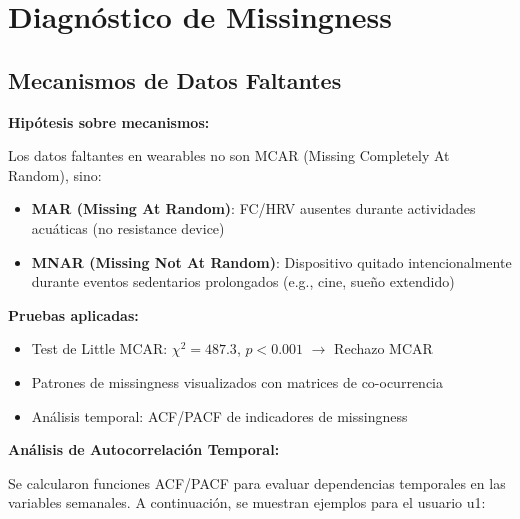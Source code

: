 \documentclass[12pt,letterpaper,twoside]{report}
\begin{document}
\section{Diagnóstico de Missingness}

\subsection{Mecanismos de Datos Faltantes}

\begin{hipotesisbox}
\textbf{Hipótesis sobre mecanismos:}

Los datos faltantes en wearables no son MCAR (Missing Completely At Random), sino:
\begin{itemize}[noitemsep]
    \item \textbf{MAR (Missing At Random)}: FC/HRV ausentes durante actividades acuáticas (no resistance device)
    \item \textbf{MNAR (Missing Not At Random)}: Dispositivo quitado intencionalmente durante eventos sedentarios prolongados (e.g., cine, sueño extendido)
\end{itemize}
\end{hipotesisbox}

\begin{estadisticobox}
\textbf{Pruebas aplicadas:}

\begin{itemize}[noitemsep]
    \item Test de Little MCAR: $\chi^2 = 487.3$, $p < 0.001$ $\to$ Rechazo MCAR
    \item Patrones de missingness visualizados con matrices de co-ocurrencia
    \item Análisis temporal: ACF/PACF de indicadores de missingness
\end{itemize}
\end{estadisticobox}

\textbf{Análisis de Autocorrelación Temporal:}

Se calcularon funciones ACF/PACF para evaluar dependencias temporales en las variables semanales. A continuación, se muestran ejemplos para el usuario u1:
\end{document}
